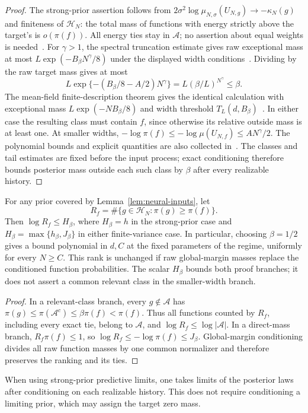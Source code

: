 \begin{proof}
The strong-prior assertion follows from
$2\sigma^2\log\mu_{N,\sigma}(U_{N,g})\to-\kappa_N(g)$ and
finiteness of $\mathcal H_N$: the total mass of functions with energy
strictly above the target's is $o(\pi(f))$. All energy ties stay in
$\mathcal A$; no assertion about equal weights is needed~\cite{strong,online}.
For $\gamma>1$, the spectral truncation estimate gives raw exceptional
mass at most $L\exp(-B_\beta N^\gamma/8)$ under the displayed width
conditions~\cite{above}. Dividing by the raw target mass gives at most
\[
 L\exp\{-(B_\beta/8-A/2)N^\gamma\}
 =L(\beta/L)^{N^\gamma}\le\beta.
\]
The mean-field finite-description theorem gives the identical calculation
with exceptional mass $L\exp(-NB_\beta/8)$ and width threshold
$T_L(d,B_\beta)$~\cite{meanfield}. In either case the resulting class
must contain $f$, since otherwise its relative outside mass is at least
one. At smaller widths,
$-\log\pi(f)\le-\log\mu(U_{N,f})\le AN^\gamma/2$.
The polynomial bounds and explicit quantities are also collected
in~\cite{online}. The classes and tail estimates are fixed before the
input process; exact conditioning therefore bounds posterior mass outside
each such class by $\beta$ after every realizable history.
\end{proof}

\begin{corollary}
\label{cor:neural-rank}
For any prior covered by Lemma~\ref{lem:neural-inputs}, let
\[
 R_f=\#\{g\in\mathcal H_N:\pi(g)\ge\pi(f)\}.
\]
Then $\log R_f\le H_\beta$, where $H_\beta=h$ in the strong-prior
case and $H_\beta=\max\{h_\beta,J_\beta\}$ in either finite-variance
case. In particular, choosing $\beta=1/2$ gives a bound polynomial in
$d,C$ at the fixed parameters of the regime, uniformly for every
$N\ge C$. This rank is unchanged if raw global-margin masses replace
the conditioned function probabilities. The scalar $H_\beta$ bounds
both proof branches; it does not assert a common relevant class in the
smaller-width branch.
\end{corollary}

\begin{proof}
In a relevant-class branch, every $g\notin\mathcal A$ has
$\pi(g)\le\pi(\mathcal A^c)\le\beta\pi(f)<\pi(f)$.
Thus all functions counted by $R_f$, including every exact tie, belong
to $\mathcal A$, and $\log R_f\le\log|\mathcal A|$.
In a direct-mass branch, $R_f\pi(f)\le1$, so
$\log R_f\le-\log\pi(f)\le J_\beta$.
Global-margin conditioning divides all raw function masses by one common
normalizer and therefore preserves the ranking and its ties.
\end{proof}

When using strong-prior predictive limits, one takes limits of the
posterior laws after conditioning on each realizable history. This does
not require conditioning a limiting prior, which may assign the target
zero mass.
